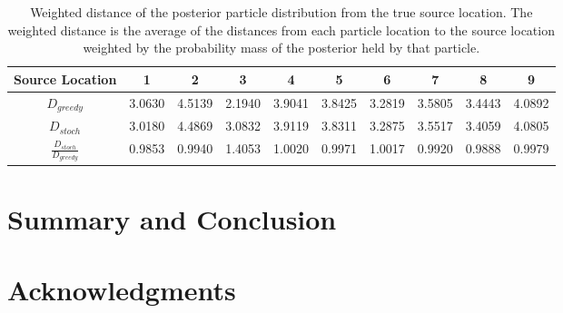 \documentclass[submit]{aiaa-pretty-modified}
\begin{document}


\begin{table}[htb]
\begin{center}
\begin{tabular}{|c||c||c||c||c||c||c||c||c||c|}
\hline
 Source Location & 1 & 2 & 3 & 4 & 5 & 6 & 7 & 8 & 9 \\
\hline \hline
$D_{greedy}$ & 3.0630 & 4.5139 & 2.1940 & 3.9041 & 3.8425 & 3.2819 & 3.5805 & 3.4443 & 4.0892 \\
\hline
$D_{stoch}$ & 3.0180 & 4.4869 & 3.0832 & 3.9119 & 3.8311 & 3.2875 & 3.5517 & 3.4059 & 4.0805 \\
\hline
$\frac{D_{stoch}}{D_{greedy}}$ & 0.9853 & 0.9940 & 1.4053 & 1.0020 & 0.9971 & 1.0017 & 0.9920 & 0.9888 & 0.9979 \\
\hline
\end{tabular}
\caption{Weighted distance of the posterior particle distribution from the true
  source location. The weighted distance is the average of the distances from
  each particle location to the source location weighted by the probability
  mass of the posterior held by that particle.}
\label{tab:weighted-distance}
\end{center}
\end{table}

\newpage

\section{Summary and Conclusion}

\section{Acknowledgments}

\newpage


\nocite{*}
\end{document}
